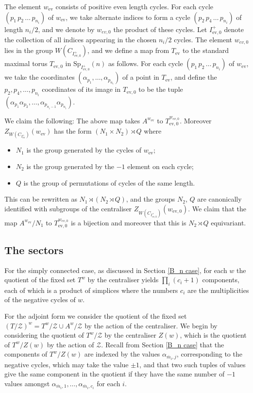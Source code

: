 \documentclass[11pt,a4paper]{article}
\def\Sp{\mathrm{Sp}}
\def\mbar{\overline{m}}
\def\cZ{\mathcal{Z}}
\def\cZ{{\mathcal Z}}
\def\mbar{\overline{m}}
\def\ev{\mathrm{ev}}
\begin{document}
The element $w_\ev$ consists of positive even length cycles. For each cycle $(p_1\,p_2\,\dots\,p_{n_i})$ of $w_\ev$, we take alternate indices to form a cycle $(p_2\,p_4\,\dots\,p_{n_i})$ of length $n_i/2$, and we denote by $w_{ev,0}$ the product of these cycles.  Let $I^+_{\ev,0}$ denote the collection of all indices appearing in the chosen $n_i/2$ cycles.  The element $w_{ev,0}$ lies in the group $W(C_{I^+_{\ev,0}})$, and we define a map from $T_\ev$ to the standard maximal torus $T_{\ev,0}$ in $\Sp_{I^+_{\ev,0}}(n)$ as follows.  For each cycle  $(p_1\,p_2\,\dots\,p_{n_i})$ of $w_\ev$, we take the coordinates $(\alpha_{p_1},\dots,\alpha_{p_{n_i}})$ of a point in $T_\ev$, and define the $p_2,p_4,\dots,p_{n_i}$ coordinates of its image in $T_{\ev,0}$ to be the tuple $(\alpha_{p_1}\alpha_{p_2},\dots,\alpha_{p_{n_i-1}}\alpha_{p_{n_i}})$.

We claim the following:  The above map takes $A^{w_{\ev}}$ to $T_{\ev,0}^{w_{ev,0}}$.  Moreover $Z_{W(C_{I^+_{\ev}})}(w_{\ev})$ has the form $(N_1\times N_2)\rtimes Q$ where
\begin{itemize}
    \item $N_1$ is the group generated by the cycles of $w_\ev$;
    \item $N_2$ is the group generated by the $-1$ element on each cycle;
    \item $Q$ is the group of permutations of cycles of the same length.
\end{itemize}
This can be rewritten as $N_1\rtimes (N_2\rtimes Q)$, and the groups $N_2$, $Q$ are canonically identified with subgroups of the centraliser $Z_{W(C_{I^+_{\ev,0}})}(w_{\ev,0})$. We claim that the map $A^{w_{\ev}}/N_1$ to $T_{\ev,0}^{w_{ev,0}}$ is a bijection and moreover that this is $N_2\rtimes Q$ equivariant.




\subsection{The sectors} For the simply connected case, as discussed in Section \ref{B_n case}, for each $w$ the quotient of the fixed set $T^w$ by the centraliser yields $\prod_i(c_i+1)$ components, each of which is a product of simplices where the numbers $c_i$ are the multiplicities of the negative cycles of $w$.

For the adjoint form we consider the quotient of the fixed set $(T/\cZ)^w=T^w/\cZ \cup A^w/\cZ$ by the action of the centraliser.
We begin by considering the quotient of $T^w /\cZ$ by the centraliser $Z(w)$, which is the quotient of $T^w/Z(w)$ by the action of $\cZ$.  Recall from Section \ref{B_n case} that the components of $T^w/Z(w)$ are indexed by the values $\alpha_{\mbar_i,j}$, corresponding to the negative cycles, which may take the value $\pm1$, and that two such tuples of values give the same component in the quotient if they have the same number of $-1$ values amongst $\alpha_{\mbar_i,1},\dots,\alpha_{\mbar_i,c_i}$ for each $i$.
\end{document}
